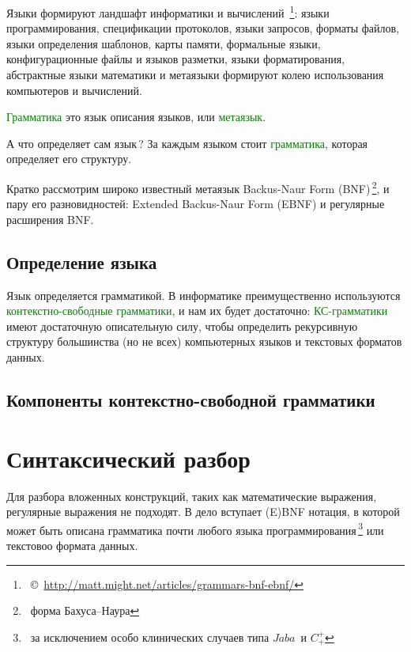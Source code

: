 \documentclass[oneside,10pt]{article}
\newcommand{\note}[1]{\,\footnote{\ #1}}
\newcommand{\cp}[1]{\note{\copyright\ #1}}
\newcommand{\term}[1]{\textcolor{green}{#1}}
\newcommand{\cpp}{$C^+_+$}
\newcommand{\java}{$Jaba$}
\begin{document}
Языки формируют ландшафт информатики и вычислений
\cp{\url{http://matt.might.net/articles/grammars-bnf-ebnf/}}:
языки программирования, спецификации протоколов, языки запросов, форматы файлов,
языки определения шаблонов, карты памяти, формальные языки, конфигурационные
файлы и языков разметки, языки форматирования, абстрактные языки математики и
метаязыки формируют колею использования компьютеров и вычислений.
\begin{framed}
\term{Грамматика} это язык описания языков, или \term{метаязык}.
\end{framed}
А что определяет сам язык\,?
За каждым языком стоит \term{грамматика}, которая определяет его структуру.

\noindent
Кратко рассмотрим широко известный метаязык Backus-Naur Form
(BNF)\note{форма Бахуса--Наура}, и пару его разновидностей: Extended
Backus-Naur Form (EBNF) и регулярные расширения BNF.

\subsection{Определение языка}

Язык определяется грамматикой. В информатике преимущественно используются
\term{контекстно-свободные грамматики}, и нам их будет достаточно:
\term{КС-грамматики} имеют достаточную описательную силу, чтобы определить
рекурсивную структуру большинства (но не всех) компьютерных языков и текстовых
форматов данных.

\subsection{Компоненты контекстно-свободной грамматики}

\clearpage
\section{Синтаксический разбор}

Для разбора вложенных конструкций, таких как математические выражения,
регулярные выражения не подходят. В дело вступает (E)BNF нотация, в которой
может быть описана грамматика почти любого языка программирования\note{за
исключением особо клинических случаев типа \java\ и \cpp} или текстовоо формата
данных.
\end{document}
